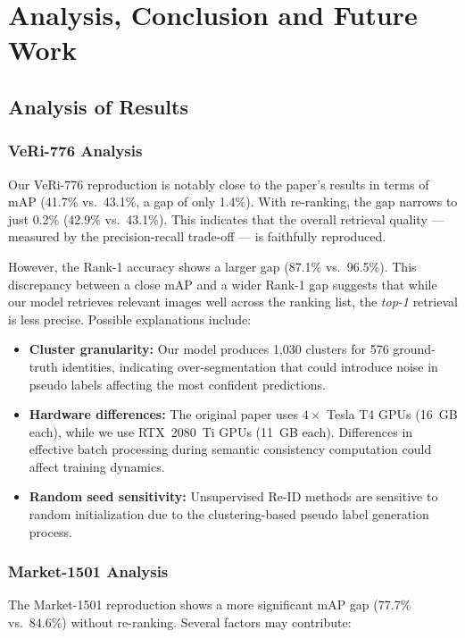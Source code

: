 \chapter{Analysis, Conclusion and Future Work}

\section{Analysis of Results}

\subsection{VeRi-776 Analysis}

Our VeRi-776 reproduction is notably close to the paper's results in terms of mAP (41.7\% vs.\ 43.1\%, a gap of only 1.4\%). With re-ranking, the gap narrows to just 0.2\% (42.9\% vs.\ 43.1\%). This indicates that the overall retrieval quality --- measured by the precision-recall trade-off --- is faithfully reproduced.

However, the Rank-1 accuracy shows a larger gap (87.1\% vs.\ 96.5\%). This discrepancy between a close mAP and a wider Rank-1 gap suggests that while our model retrieves relevant images well across the ranking list, the \textit{top-1} retrieval is less precise. Possible explanations include:

\begin{itemize}
    \item \textbf{Cluster granularity:} Our model produces 1,030 clusters for 576 ground-truth identities, indicating over-segmentation that could introduce noise in pseudo labels affecting the most confident predictions.
    \item \textbf{Hardware differences:} The original paper uses $4 \times$ Tesla T4 GPUs (16~GB each), while we use RTX~2080~Ti GPUs (11~GB each). Differences in effective batch processing during semantic consistency computation could affect training dynamics.
    \item \textbf{Random seed sensitivity:} Unsupervised Re-ID methods are sensitive to random initialization due to the clustering-based pseudo label generation process.
\end{itemize}

\subsection{Market-1501 Analysis}

The Market-1501 reproduction shows a more significant mAP gap (77.7\% vs.\ 84.6\%) without re-ranking. Several factors may contribute:

